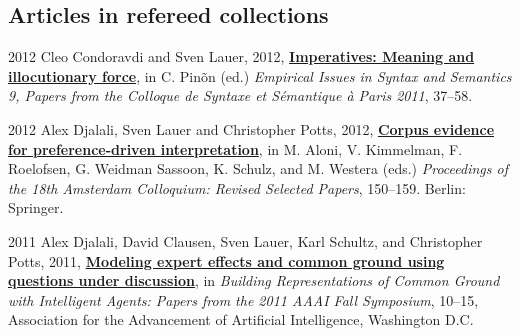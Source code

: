 \subsection*{Articles in refereed collections}
\begin{dated}
	\item[2012]
		Cleo Condoravdi and Sven Lauer, 2012,
		\href{http://www.cssp.cnrs.fr/eiss9/eiss9_condoravdi-and-lauer.pdf}{\textbf{Imperatives: Meaning and illocutionary force}}, 
		in C. Pin\~on (ed.) \textit{Empirical Issues in Syntax and Semantics 9, Papers from the Colloque de Syntaxe et S\'emantique \`a Paris 2011}, 
		37--58.
	\item[2012]
		Alex Djalali, Sven Lauer and Christopher Potts, 2012, 
		\href{https://web.stanford.edu/~cgpotts/papers/djalali-lauer-potts-ac2011.pdf}{\textbf{Corpus evidence for preference-driven interpretation}}, 
		in M. Aloni, V. Kimmelman, F. Roelofsen, G. Weidman Sassoon, K. Schulz, and M. Westera (eds.)
		\textit{Proceedings of the 18th Amsterdam Colloquium: Revised Selected Papers}, 
		150--159. Berlin: Springer.
	\item[2011]
		Alex Djalali, David Clausen, Sven Lauer, Karl Schultz, and Christopher Potts, 2011, 
		\href{http://semanticsarchive.net/Archive/zZiM2YwN/djalali_et_al.pdf}{\textbf{Modeling expert effects and common ground using questions under discussion}}, 
		in \textit{Building Representations of Common Ground with Intelligent Agents: Papers from the 2011 AAAI Fall Symposium}, 
		10--15, Association for the Advancement of Artificial Intelligence, Washington D.C.
\end{dated} 

